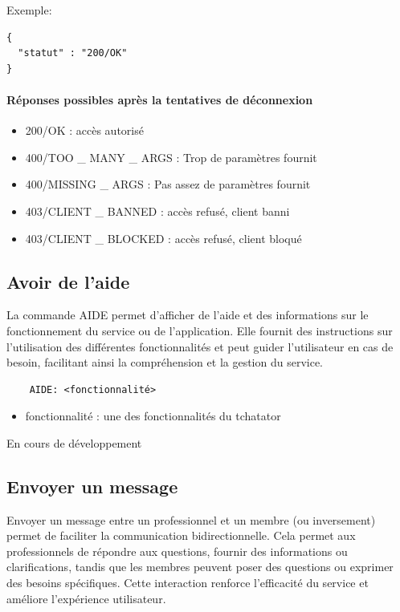 \documentclass{report}
\begin{document}
Exemple:
\begin{verbatim}
{
  "statut" : "200/OK"
}
\end{verbatim}

\paragraph{Réponses possibles après la tentatives de déconnexion}

\begin{itemize}
	\item 200/OK : accès autorisé
	\item 400/TOO \_ MANY \_ ARGS : Trop de paramètres fournit
	\item 400/MISSING \_ ARGS : Pas assez de paramètres fournit
	\item 403/CLIENT \_ BANNED : accès refusé, client banni
	\item 403/CLIENT \_ BLOCKED : accès refusé, client bloqué
\end{itemize}

\subsection{Avoir de l’aide}

La commande AIDE permet d'afficher de l'aide et des informations sur le fonctionnement du service ou de l'application. Elle fournit des instructions sur l'utilisation des différentes fonctionnalités et peut guider l'utilisateur en cas de besoin, facilitant ainsi la compréhension et la gestion du service.

\begin{verbatim}
	AIDE: <fonctionnalité>
\end{verbatim}

\begin{itemize}
	\item fonctionnalité : une des fonctionnalités du tchatator
\end{itemize}

En cours de développement

\subsection{Envoyer un message}

Envoyer un message entre un professionnel et un membre (ou inversement) permet de faciliter la communication bidirectionnelle. Cela permet aux professionnels de répondre aux questions, fournir des informations ou clarifications, tandis que les membres peuvent poser des questions ou exprimer des besoins spécifiques. Cette interaction renforce l'efficacité du service et améliore l'expérience utilisateur.
\end{document}
